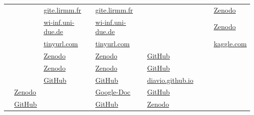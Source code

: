 \begin{tabular} { p{} p{} p{} p{} p{}  | p{} p{} p{} p{} p{}  }
\cite{ \papertwohundredtwentyfifth } &  & \href{https://gite.lirmm.fr/fca4j/companion-data-for-rca-uml-llm}{\underline{gite.lirmm.fr}} &  & \href{https://gite.lirmm.fr/fca4j/companion-data-for-rca-uml-llm}{\underline{gite.lirmm.fr}} & \cite{ \papertwohundredtwentythird } &  &  &  & \href{https://zenodo.org/records/4121935}{\underline{Zenodo}}\\ 
\cite{ \papertwohundredtwentysixth } &  & \href{https://www.wi-inf.uni-due.de/LE4MM/AutoMLM/}{\underline{wi-inf.uni-due.de}} &  & \href{https://www.wi-inf.uni-due.de/LE4MM/AutoMLM/}{\underline{wi-inf.uni-due.de}} & \cite{ \papertwohundredthirtyseventh } &  &  &  & \href{https://zenodo.org/records/15103682}{\underline{Zenodo}}\\ 
\cite{ \papertwohundredfortysecond } &  & \href{https://tinyurl.com/4cy9s9nt}{\underline{tinyurl.com}} &  & \href{https://tinyurl.com/4cy9s9nt}{\underline{tinyurl.com}} & \cite{ \papertwohundredfiftythird } &  &  &  & \href{https://www.kaggle.com/datasets/johnsmith88/heart-disease-dataset}{\underline{kaggle.com}}\\ 
\cite{ \papertwohundredfortythird } &  & \href{https://zenodo.org/records/15768586}{\underline{Zenodo}} &  & \href{https://zenodo.org/records/15768586}{\underline{Zenodo}} & \cite{ \papertwentyeighth } & \href{https://github.com/AlaouiMdaghriAhmed/Ecore-Gen}{\underline{GitHub}} &  &  & \\ 
\cite{ \papertwohundredfortyeighth } &  & \href{https://zenodo.org/records/12734347}{\underline{Zenodo}} &  & \href{https://zenodo.org/records/12734347}{\underline{Zenodo}} & \cite{ \papersixtythird } & \href{https://github.com/lbdudc/dsl-xpert}{\underline{GitHub}} &  &  & \\ 
\cite{ \papertwohundredfiftieth } &  & \href{https://github.com/renjith-r02/prompts-plantuml-similarityscore}{\underline{GitHub}} &  & \href{https://github.com/renjith-r02/prompts-plantuml-similarityscore}{\underline{GitHub}} & \cite{ \papersixtyfifth } & \href{https://diavio.github.io/diavio/}{\underline{diavio.github.io}} &  &  & \\ 
\cite{ \paperthird } & \href{https://zenodo.org/records/14346539}{\underline{Zenodo}} &  &  & \href{https://docs.google.com/document/d/1Xyr6hDOQb-ooNnwY71yE5w3pOiZpmD-7n17DfqyzAy8/edit?tab=t.0}{\underline{Google-Doc}} & \cite{ \paperonehundredtwentyfirst } & \href{https://github.com/meriembenchaaben/model-completion}{\underline{GitHub}} &  &  & \\ 
\cite{ \paperthirtieth } & \href{https://github.com/santos-wesley/Terpsichora}{\underline{GitHub}} &  &  & \href{https://github.com/santos-wesley/Terpsichora/tree/main/Models}{\underline{GitHub}} & \cite{ \paperonehundredtwentysixth } & \href{https://zenodo.org/records/4734223}{\underline{Zenodo}} &  &  & \\ 

\end{tabular}
